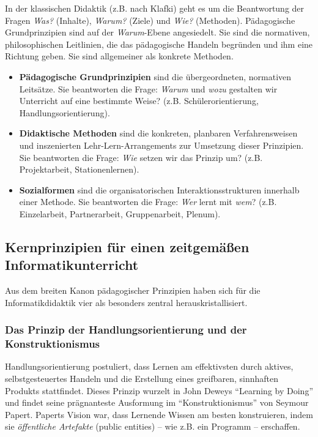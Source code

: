 \documentclass[a5paper,pagesize,10pt,bibtotoc,pointlessnumbers,
normalheadings,DIV=9,twoside=false]{scrbook}
\begin{document}
In der klassischen Didaktik (z.B. nach Klafki) geht es um die Beantwortung der Fragen \textit{Was?} (Inhalte), \textit{Warum?} (Ziele) und \textit{Wie?} (Methoden). Pädagogische Grundprinzipien sind auf der \textit{Warum}-Ebene angesiedelt. Sie sind die normativen, philosophischen Leitlinien, die das pädagogische Handeln begründen und ihm eine Richtung geben. Sie sind allgemeiner als konkrete Methoden.

\begin{itemize}
    \item \textbf{Pädagogische Grundprinzipien} sind die übergeordneten, normativen Leitsätze. Sie beantworten die Frage: \textit{Warum} und \textit{wozu} gestalten wir Unterricht auf eine bestimmte Weise? (z.B. Schülerorientierung, Handlungsorientierung).
    \item \textbf{Didaktische Methoden} sind die konkreten, planbaren Verfahrensweisen und inszenierten Lehr-Lern-Arrangements zur Umsetzung dieser Prinzipien. Sie beantworten die Frage: \textit{Wie} setzen wir das Prinzip um? (z.B. Projektarbeit, Stationenlernen).
    \item \textbf{Sozialformen} sind die organisatorischen Interaktionsstrukturen innerhalb einer Methode. Sie beantworten die Frage: \textit{Wer} lernt mit \textit{wem}? (z.B. Einzelarbeit, Partnerarbeit, Gruppenarbeit, Plenum).
\end{itemize}

\subsection*{Kernprinzipien für einen zeitgemäßen Informatikunterricht}

Aus dem breiten Kanon pädagogischer Prinzipien haben sich für die Informatikdidaktik vier als besonders zentral herauskristallisiert.

\subsubsection{Das Prinzip der Handlungsorientierung und der Konstruktionismus}

Handlungsorientierung postuliert, dass Lernen am effektivsten durch aktives, selbstgesteuertes Handeln und die Erstellung eines greifbaren, sinnhaften Produkts stattfindet. Dieses Prinzip wurzelt in John Deweys ``Learning by Doing'' und findet seine prägnanteste Ausformung im ``Konstruktionismus'' von Seymour Papert. Paperts Vision war, dass Lernende Wissen am besten konstruieren, indem sie \textit{öffentliche Artefakte} (public entities) -- wie z.B. ein Programm -- erschaffen.
\end{document}
